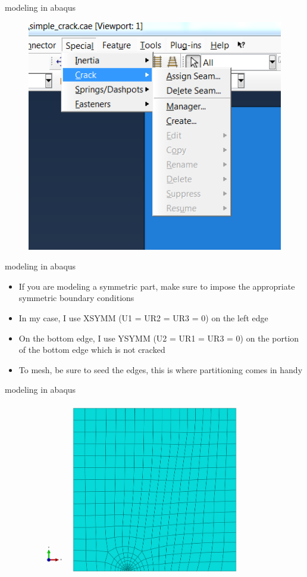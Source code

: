 \documentclass[10pt]{beamer}
\begin{document}
	\begin{frame}{modeling in abaqus}
		\begin{figure}
		\centering
		\includegraphics[width=0.7\linewidth]{../Figures/specialty_elements}
		\label{fig:specialty_elements}
		\end{figure}
	\end{frame}
	
	\begin{frame}{modeling in abaqus}
		\begin{itemize}[<+->]
			\item If you are modeling a symmetric part, make sure to impose the appropriate symmetric boundary conditions
			\item In my case, I use XSYMM (U1 = UR2 = UR3 = 0) on the left edge
			\item On the bottom edge, I use YSYMM (U2 = UR1 = UR3 = 0) on the portion of the bottom edge which is not cracked
			\item To mesh, be sure to seed the edges, this is where partitioning comes in handy
		\end{itemize}
	\end{frame}
	
	\begin{frame}{modeling in abaqus}
		\begin{figure}
			\centering
			\includegraphics[width=0.7\linewidth]{../Figures/meshed}
			\label{fig:meshed}
		\end{figure}
	\end{frame}
	
\end{document}
